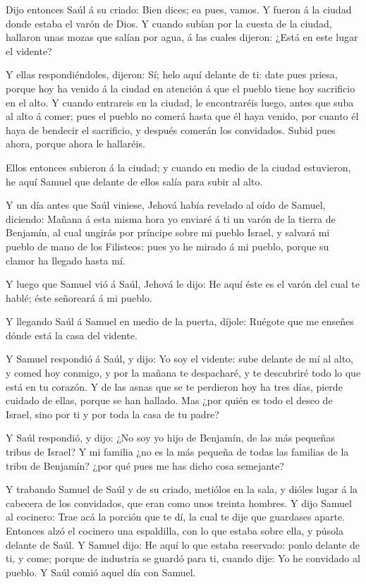  Dijo entonces Saúl á su criado: Bien dices; ea pues,
vamos. Y fueron á la ciudad donde estaba el varón de Dios.
 Y cuando subían por la cuesta de la ciudad, hallaron
unas mozas que salían por agua, á las cuales dijeron: ¿Está en este
lugar el vidente?

 Y ellas respondiéndoles, dijeron: Sí; helo aquí delante
de ti: date pues priesa, porque hoy ha venido á la ciudad en atención á
que el pueblo tiene hoy sacrificio en el alto.  Y cuando
entrareis en la ciudad, le encontraréis luego, antes que suba al alto á
comer; pues el pueblo no comerá hasta que él haya venido, por cuanto él
haya de bendecir el sacrificio, y después comerán los convidados. Subid
pues ahora, porque ahora le hallaréis.

 Ellos entonces subieron á la ciudad; y cuando en medio
de la ciudad estuvieron, he aquí Samuel que delante de ellos salía para
subir al alto.

 Y un día antes que Saúl viniese, Jehová había revelado
al oído de Samuel, diciendo:  Mañana á esta misma hora yo
enviaré á ti un varón de la tierra de Benjamín, al cual ungirás por
príncipe sobre mi pueblo Israel, y salvará mi pueblo de mano de los
Filisteos: pues yo he mirado á mi pueblo, porque su clamor ha llegado
hasta mí.

 Y luego que Samuel vió á Saúl, Jehová le dijo: He aquí
éste es el varón del cual te hablé; éste señoreará á mi pueblo.

 Y llegando Saúl á Samuel en medio de la puerta, díjole:
Ruégote que me enseñes dónde está la casa del vidente.

 Y Samuel respondió á Saúl, y dijo: Yo soy el vidente:
sube delante de mí al alto, y comed hoy conmigo, y por la mañana te
despacharé, y te descubriré todo lo que está en tu corazón.
 Y de las asnas que se te perdieron hoy ha tres días,
pierde cuidado de ellas, porque se han hallado. Mas ¿por quién es todo
el deseo de Israel, sino por ti y por toda la casa de tu padre?

 Y Saúl respondió, y dijo: ¿No soy yo hijo de Benjamín,
de las más pequeñas tribus de Israel? Y mi familia ¿no es la más pequeña
de todas las familias de la tribu de Benjamín? ¿por qué pues me has
dicho cosa semejante?

 Y trabando Samuel de Saúl y de su criado, metiólos en la
sala, y dióles lugar á la cabecera de los convidados, que eran como unos
treinta hombres.  Y dijo Samuel al cocinero: Trae acá la
porción que te dí, la cual te dije que guardases aparte. 
Entonces alzó el cocinero una espaldilla, con lo que estaba sobre ella,
y púsola delante de Saúl. Y Samuel dijo: He aquí lo que estaba
reservado: ponlo delante de ti, y come; porque de industria se guardó
para ti, cuando dije: Yo he convidado al pueblo. Y Saúl comió aquel día
con Samuel.

